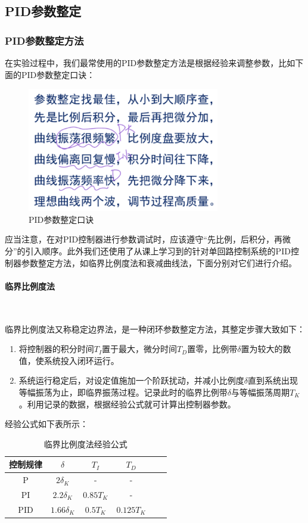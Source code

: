 \documentclass[UTF8]{article}
\begin{document}
\subsection{PID参数整定}
\subsubsection{PID参数整定方法}
在实验过程中，我们最常使用的PID参数整定方法是根据经验来调整参数，比如下面的PID参数整定口诀：
\begin{figure}[H]
    \centering %
    \includegraphics[width=.4\textwidth]{figure/PID参数整定口诀.png} 
    \caption{PID参数整定口诀} %
\end{figure}

应当注意，在对PID控制器进行参数调试时，应该遵守“先比例，后积分，再微分”的引入顺序。此外我们还使用了从课上学习到的针对单回路控制系统的PID控制器参数整定方法，如临界比例度法和衰减曲线法，下面分别对它们进行介绍。

\paragraph{临界比例度法}~{}

临界比例度法又称稳定边界法，是一种闭环参数整定方法，其整定步骤大致如下：
\begin{enumerate}
    \item 将控制器的积分时间$T_I$置于最大，微分时间$T_D$置零，比例带$\delta$置为较大的数值，使系统投入闭环运行。
    \item 系统运行稳定后，对设定值施加一个阶跃扰动，并减小比例度$\delta$直到系统出现等幅振荡为止，即临界振荡过程。记录此时的临界比例带$\delta$与等幅振荡周期$T_K$。利用记录的数据，根据经验公式就可计算出控制器参数。
\end{enumerate}

经验公式如下表所示：
\begin{table}[H] %
\centering %
\begin{tabular}{cccccc} %
	\toprule %
    控制规律 & $\delta$ & $T_I$ & $T_D$ \\
	\midrule %
	P & $2\delta_K$ & - & - \\
    PI & $2.2\delta_K$ & $0.85T_K$ & - \\
    PID & $1.66\delta_K$ & $0.5T_K$ & $0.125T_K$ \\ 
	\bottomrule %
\end{tabular}
\caption{临界比例度法经验公式} %
\end{table}
\end{document}
